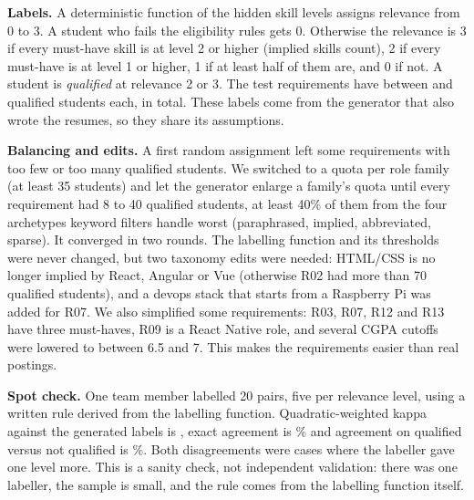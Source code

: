 \documentclass[conference]{IEEEtran}
\begin{document}
\textbf{Labels.} A deterministic function of the hidden skill levels assigns relevance from 0 to 3. A student who fails the eligibility rules gets 0. Otherwise the relevance is 3 if every must-have skill is at level 2 or higher (implied skills count), 2 if every must-have is at level 1 or higher, 1 if at least half of them are, and 0 if not. A student is \emph{qualified} at relevance 2 or 3. The test requirements have between \NQualifiedTestMin{} and \NQualifiedTestMax{} qualified students each, \NQualifiedTest{} in total. These labels come from the generator that also wrote the resumes, so they share its assumptions.

\textbf{Balancing and edits.} A first random assignment left some requirements with too few or too many qualified students. We switched to a quota per role family (at least 35 students) and let the generator enlarge a family's quota until every requirement had 8 to 40 qualified students, at least 40\% of them from the four archetypes keyword filters handle worst (paraphrased, implied, abbreviated, sparse). It converged in two rounds. The labelling function and its thresholds were never changed, but two taxonomy edits were needed: HTML/CSS is no longer implied by React, Angular or Vue (otherwise R02 had more than 70 qualified students), and a devops stack that starts from a Raspberry Pi was added for R07. We also simplified some requirements: R03, R07, R12 and R13 have three must-haves, R09 is a React Native role, and several CGPA cutoffs were lowered to between 6.5 and 7. This makes the requirements easier than real postings.

\textbf{Spot check.} One team member labelled 20 pairs, five per relevance level, using a written rule derived from the labelling function. Quadratic-weighted kappa against the generated labels is \SpotKappa{}, exact agreement is \SpotExactPct{}\% and agreement on qualified versus not qualified is \SpotBinaryPct{}\%. Both disagreements were cases where the labeller gave one level more. This is a sanity check, not independent validation: there was one labeller, the sample is small, and the rule comes from the labelling function itself.
\end{document}

